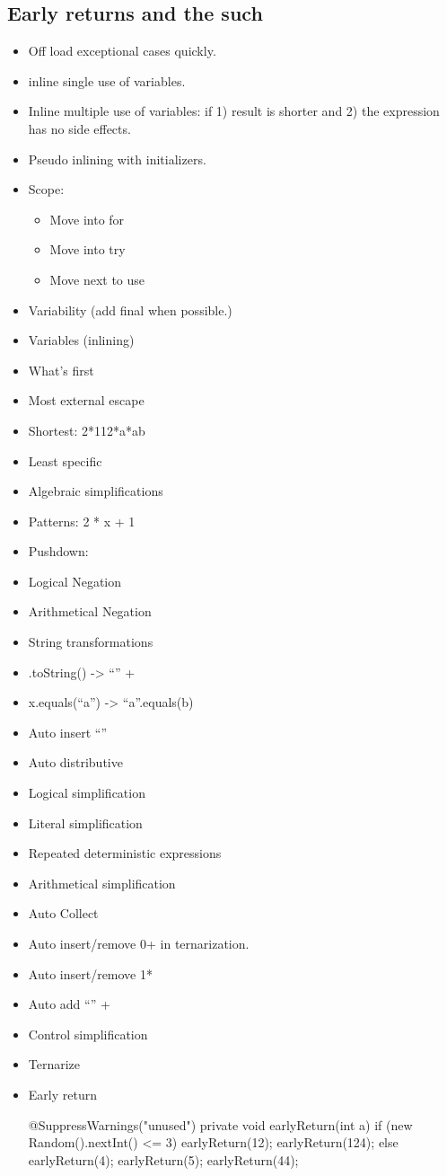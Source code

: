 \subsection{Early returns and the such}
\begin{itemize}
\item Off load exceptional cases quickly.
\item inline single use of variables.
\item Inline multiple use of variables: if 1) result is shorter and 2) the expression has no side effects.
\item Pseudo inlining with initializers.
\item Scope:
\begin{itemize}
 \item Move into for
 \item Move into try
 \item Move next to use
\end{itemize}
\item Variability (add final when possible.)
\item Variables (inlining)
\item What’s first
\item Most external escape
\item Shortest: 2*112*a*ab
\item Least specific
\item Algebraic simplifications
\item Patterns: 2 * x + 1
\item Pushdown:
\item Logical Negation
\item Arithmetical Negation
\item String transformations
\item .toString() -> “” +
\item x.equals(“a”) -> “a”.equals(b)
\item Auto insert “”
\item Auto distributive
\item Logical simplification
\item Literal simplification
\item Repeated deterministic expressions
\item Arithmetical simplification
\item Auto Collect
\item Auto insert/remove 0+ in ternarization.
\item Auto insert/remove 1*
\item Auto add “” +
\item Control simplification
\item Ternarize
\item Early return
\begin{java}
@SuppressWarnings("unused") private
void earlyReturn(int a) {
  if (new Random().nextInt() <= 3) {
    earlyReturn(12);
    earlyReturn(124);
    } else {
    earlyReturn(4);
    earlyReturn(5);
    earlyReturn(44);
  }
}
\end{java}
 
\end{itemize}

